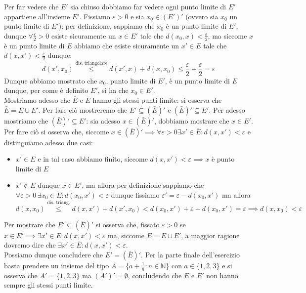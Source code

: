 \documentclass{report}
\begin{document}
\begin{mysolution}
	Per far vedere che $E'$ sia chiuso dobbiamo far vedere ogni punto limite di $E'$ appartiene all'insieme $E'$. Fissiamo $\varepsilon > 0$ e sia $x_0 \in (E')'$ (ovvero sia $x_0$ un punto limite di $E'$): per definizione, sappiamo che $x_0$ è un punto limite di $E'$, dunque $\forall \frac{\varepsilon}{2} > 0$ esiste sicuramente un $x \in E'$ tale che $d(x_0, x) < \frac{\varepsilon}{2}$, ma siccome $x$ è un punto limite di $E$ abbiamo che esiste sicuramente un $x' \in E$ tale che $d(x, x') < \frac{\varepsilon}{2}$ dunque:
	$$
		d(x', x_0) \stackrel{\text{dis. triangolare}}{\leq} d(x', x) + d(x, x_0) \leq \frac{\varepsilon}{2} + \frac{\varepsilon}{2} = \varepsilon
	$$
	Dunque abbiamo mostrato che $x_0$, punto limite di $E'$, è un punto limite di $E$ dunque, per come è definito $E'$, si ha che $x_0 \in E'$. \\
	Mostriamo adesso che $\bar{E}$ e $E$ hanno gli stessi punti limite: si osserva che $\bar{E} = E \cup E'$. Per fare ciò mostreremo che $E' \subseteq (\bar{E})'$ e $(\bar{E})' \subseteq E'$. Per adesso mostriamo che $(\bar{E})' \subseteq E'$: sia adesso $x \in (\bar{E})'$, dobbiamo mostrare che $x \in E'$. Per fare ciò si osserva che, siccome $x \in (\bar{E})' \implies \forall \varepsilon > 0 \exists x' \in \bar{E}: d(x, x') < \varepsilon$ e distinguiamo adesso due casi:
	\begin{itemize}
		\item $x' \in E$ e in tal caso abbiamo finito, siccome $d(x, x') < \varepsilon \implies x$ è punto limite di $E$
		\item $x' \not\in E$ dunque $x \in E'$, ma allora per definizione sappiamo che $\forall \varepsilon > 0 \, \exists x_0 \in E: d(x_0, x') < \varepsilon$ dunque fissiamo $\varepsilon' = \varepsilon - d(x_0, x')$ ma allora $d(x, x_0) \stackrel{\text{dis. triang.}}{\leq} d(x, x') + d(x', x_0) < d(x_0, x') + \varepsilon - d(x_0, x') = \varepsilon \implies d(x, x_0) < \varepsilon$ 	 
	\end{itemize}
	Per mostrare che $E' \subseteq (\bar{E})'$ si osserva che, fissato $\varepsilon > 0$ se $x \in E' \implies \exists x' \in E: d(x, x') < \varepsilon$ ma, siccome $\bar{E}=E \cup E'$, a maggior ragione dovremo dire che $\exists x' \in \bar{E}: d(x, x') < \varepsilon$. \\
	Possiamo dunque concludere che $E' = (\bar{E})'$. Per la parte finale dell'esercizio basta prendere un insieme del tipo $A = \{a+\frac{1}{n}: n \in \mathbb{N}\}$ con $a \in \{1, 2, 3 \}$ e si osserva che $A' = \{1, 2, 3\}$ ma $(A')' = \emptyset$, concludendo che $E$ e $E'$ non hanno sempre gli stessi punti limite.
	

\end{mysolution}
\end{document}
